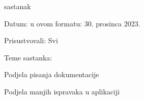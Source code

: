 \begin{packed_enum}
			\item sastanak
			\item[] \begin{packed_item}
				\item Datum: u ovom formatu: 30. prosinca 2023.
				\item Prisustvovali: Svi
				\item Teme sastanka:
				\begin{packed_item}
					\item  Podjela pisanja dokumentacije
					\item  Podjela manjih ispravaka u aplikaciji
				\end{packed_item}
			\end{packed_item}
			
		\end{packed_enum}
		
		\eject
